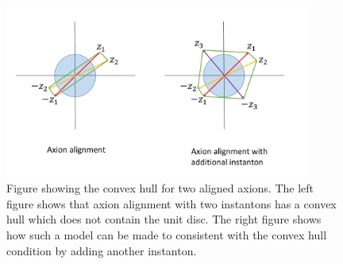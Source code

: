 \documentclass[11pt,a4paper]{article}
\numberwithin{equation}{section}
\numberwithin{table}{section}\setlength{\multlinegap}{25pt}
\begin{document}
\begin{figure}[t]
\centering
 \includegraphics[width=0.9\textwidth]{axionchalign.pdf}
\caption{Figure showing the convex hull for two aligned axions. The left figure shows that axion alignment with two instantons has a convex hull which does not contain the unit disc. The right figure shows how such a model can be made to consistent with the convex hull condition by adding another instanton.}
\label{fig:axalch}
\end{figure}
\end{document}
